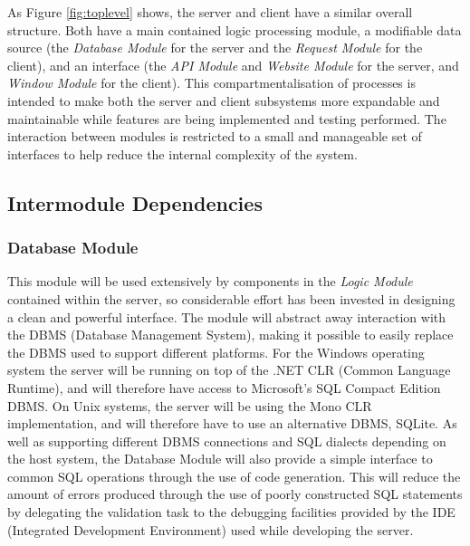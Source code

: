 As Figure \ref{fig:toplevel} shows, the server and client have a similar overall structure. Both have a main contained logic processing module, a modifiable data source (the \emph{Database Module} for the server and the \emph{Request Module} for the client), and an interface (the \emph{API Module} and \emph{Website Module} for the server, and \emph{Window Module} for the client). This compartmentalisation of processes is intended to make both the server and client subsystems more expandable and maintainable while features are being implemented and testing performed. The interaction between modules is restricted to a small and manageable set of interfaces to help reduce the internal complexity of the system.

\subsection{Intermodule Dependencies}
\subsubsection{Database Module}
This module will be used extensively by components in the \emph{Logic Module} contained within the server, so considerable effort has been invested in designing a clean and powerful interface. The module will abstract away interaction with the DBMS (Database Management System), making it possible to easily replace the DBMS used to support different platforms. For the Windows operating system the server will be running on top of the .NET CLR (Common Language Runtime), and will therefore have access to Microsoft's SQL Compact Edition DBMS. On Unix systems, the server will be using the Mono CLR implementation, and will therefore have to use an alternative DBMS, SQLite. As well as supporting different DBMS connections and SQL dialects depending on the host system, the Database Module will also provide a simple interface to common SQL operations through the use of code generation. This will reduce the amount of errors produced through the use of poorly constructed SQL statements by delegating the validation task to the debugging facilities provided by the IDE (Integrated Development Environment) used while developing the server.

